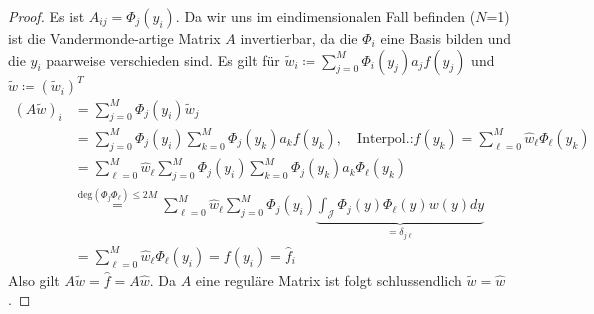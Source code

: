 \begin{proof}
Es ist $A_{ij}=\Phi_j(y_i)$. Da wir uns im eindimensionalen Fall befinden ($N$=1) ist die Vandermonde-artige Matrix $A$ invertierbar, da die $\Phi_i$ eine Basis bilden und die $y_i$ paarweise verschieden sind. Es gilt für $\widetilde{w}_i\coloneqq \sum_{j=0}^M\Phi_i(y_j)a_jf(y_j)$ und $\widetilde{w}\coloneqq (\widetilde{w}_i)^T$
\begin{align*}
\left(A\widetilde{w}\right)_i&=\sum_{j=0}^M\Phi_j(y_i)\widetilde{w}_j\\
&=\sum_{j=0}^M\Phi_j(y_i)\sum_{k=0}^M\Phi_j(y_k)a_kf(y_k),\quad \text{Interpol.:} f(y_k)=\sum_{\ell=0}^M\hat{w}_\ell\Phi_\ell(y_k)\\
&=\sum_{\ell=0}^M\hat{w}_\ell \sum_{j=0}^M\Phi_j(y_i)\sum_{k=0}^M\Phi_j(y_k)a_k\Phi_\ell(y_k)\\
&\stackrel{\text{deg}(\Phi_j\Phi_\ell)\le 2M}{=}\sum_{\ell=0}^M\hat{w}_\ell\sum_{j=0}^M\Phi_j(y_i)\underbrace{\int_\mathcal{J}\Phi_j(y)\Phi_\ell(y)w(y)dy}_{=\delta_{j\ell}}\\
&=\sum_{\ell=0}^M\hat{w}_\ell\Phi_\ell(y_i)=f(y_i)=\hat{f}_i
\end{align*}
Also gilt $A\widetilde{w}=\hat{f}=A\hat{w}$. Da $A$ eine reguläre Matrix ist folgt schlussendlich $\widetilde{w}=\hat{w}$.
\end{proof}
